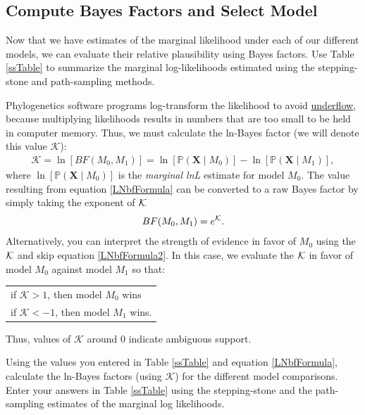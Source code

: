 \bigskip
\subsection{Compute Bayes Factors and Select Model}


Now that we have estimates of the marginal likelihood under each of our different models, we can evaluate their relative plausibility using Bayes factors.
Use Table \ref{ssTable} to summarize the marginal log-likelihoods estimated using the stepping-stone and path-sampling methods.

Phylogenetics software programs log-transform the likelihood to avoid \href{http://en.wikipedia.org/wiki/Arithmetic_underflow}{underflow}, because multiplying likelihoods results in numbers that are too small to be held in computer memory.
Thus, we must calculate the ln-Bayes factor (we will denote this value $\mathcal{K}$):
\begin{align}\label{LNbfFormula}
\mathcal{K}=\ln[BF(M_0,M_1)] = \ln[\mathbb{P}(\mathbf X \mid M_0)]-\ln[\mathbb{P}(\mathbf X \mid M_1)],
\end{align}
where $\ln[\mathbb{P}(\mathbf X \mid M_0)]$ is the \textit{marginal lnL} estimate for model $M_0$. 
The value resulting from equation \ref{LNbfFormula} can be converted to a raw Bayes factor by simply taking the exponent of $\cal{K}$
\begin{align}\label{LNbfFormula2}
BF(M_0,M_1) = e^{\cal{K}}.
\end{align}
Alternatively, you can interpret the strength of evidence in favor of $M_0$ using the $\cal{K}$ and skip equation \ref{LNbfFormula2}. 
In this case, we evaluate the $\cal{K}$ in favor of model $M_0$ against model $M_1$ so that:
\begin{center}
\begin{tabular}{l}
if $\mathcal{K} > 1$, then model $M_0$ wins\\
if $\mathcal{K} < -1$, then model $M_1$ wins.
\end{tabular}
\end{center}
Thus, values of $\mathcal{K}$ around 0 indicate ambiguous support. 


Using the values you entered in Table \ref{ssTable} and equation \ref{LNbfFormula},  calculate the ln-Bayes factors (using $\mathcal{K}$) for the different model comparisons. 
Enter your answers in Table \ref{ssTable} using the stepping-stone and the path-sampling estimates of the marginal log likelihoods. 

